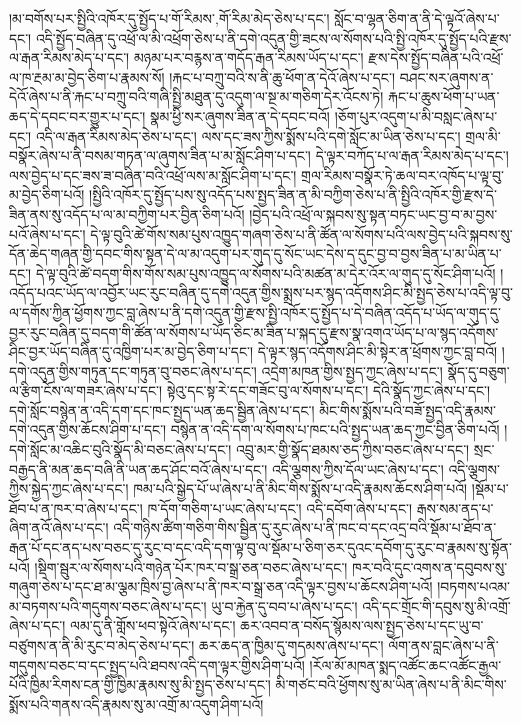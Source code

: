 །མ་བགོས་པར་སྤྱིའི་འཁོར་དུ་སྤྱོད་པ་{གོ་རིམས་,གོ་རིམ་}མེད་ཅེས་པ་དང་། སློང་བ་ལྷན་ཅིག་ན་ནི་དེ་ལྟའོ་ཞེས་པ་དང་། འདི་སྤྱོད་བཞིན་དུ་འཕྲོ་ལ་མི་འཕྲོག་ཅེས་པ་ནི་དགེ་འདུན་གྱི་ཟངས་ལ་སོགས་པའི་སྤྱི་འཁོར་དུ་སྤྱོད་པའི་རྫས་ལ་རྒན་རིམས་མེད་པ་དང་། མཉམ་པར་བརྙས་ན་གདོད་རྒན་རིམས་ཡོད་པ་དང་། རྫས་དེས་སྤྱོད་བཞིན་པའི་འཕྲོ་ལ་ཁ་རྔམ་མ་བྱེད་ཅིག་པ་རྣམས་སོ། །རྐང་པ་བཀྲུ་བའི་ས་ནི་ཆུ་ཕོག་ན་དེའོ་ཞེས་པ་དང་། བཤང་སར་ཞུགས་ན་དེའོ་ཞེས་པ་ནི་རྐང་པ་བཀྲུ་བའི་གཞི་སྤྱི་མཐུན་དུ་འདུག་ལ་སྔ་མ་གཅིག་དེར་འོངས་ཏེ། རྐང་པ་ཆུས་ཕོག་པ་ཡན་ཆད་དེ་དབང་བར་གྱུར་པ་དང་། སྣམ་ཕྱི་སར་ཞུགས་ཟིན་ན་དེ་དབང་བའོ། །ཅོག་པུར་འདུག་པ་མི་བསླང་ཞེས་པ་དང་། འདི་ལ་རྒན་རིམས་མེད་ཅེས་པ་དང་། ལས་དང་ཟས་ཀྱིས་སྨོས་པའི་དགེ་སློང་མ་ཡིན་ཅེས་པ་དང་། གྲལ་མི་བསྣོར་ཞེས་པ་ནི་བསམ་གཏན་ལ་ཞུགས་ཟིན་པ་མ་སློང་ཤིག་པ་དང་། དེ་ལྟར་བཀོད་པ་ལ་རྒན་རིམས་མེད་པ་དང་། ལས་བྱེད་པ་དང་ཟས་ཟ་བཞིན་བའི་འཕྲོ་ལས་མ་སློང་ཤིག་པ་དང་། གྲལ་རིམས་བསྣོར་ཏེ་ཆལ་བར་འཁོད་པ་ལྟ་བུ་མ་བྱེད་ཅིག་པའོ། །སྤྱིའི་འཁོར་དུ་སྤྱོད་པས་སུ་འདོད་པས་སྤྱད་ཟིན་ན་མི་བཀྱིག་ཅེས་པ་ནི་སྤྱིའི་འཁོར་གྱི་རྫས་དེ་ཟིན་ནས་སུ་འདོད་པ་ལ་མ་བཀྱིག་པར་བྱིན་ཅིག་པའོ། །བྱེད་པའི་འཕྲོ་ལ་སྐབས་སུ་སྟན་བཏང་ཡང་བྱ་བ་མ་བྱས་པའོ་ཞེས་པ་དང་། དེ་ལྟ་བུའི་ཚེ་གོས་སམ་པུས་འཁྱུད་གཞག་ཅེས་པ་ནི་ཚོན་ལ་སོགས་པའི་ལས་བྱེད་པའི་སྐབས་སུ་དོན་ཆེད་གཞན་གྱི་དབང་གིས་སྟན་དེ་ལ་མ་འདུག་པར་གུད་དུ་སོང་ཡང་དེས་ད་དུང་བྱ་བ་བྱས་ཟིན་པ་མ་ཡིན་པ་དང་། དེ་ལྟ་བུའི་ཚེ་བདག་གིས་གོས་སམ་པུས་འཁྱུད་ལ་སོགས་པའི་མཚན་མ་དེར་འོར་ལ་གུད་དུ་སོང་ཤིག་པའོ། །འདོད་པའང་ཡོད་ལ་འབྱོར་ཡང་རུང་བཞིན་དུ་དགེ་འདུན་གྱིས་སྨྲས་པར་སྙད་འདོགས་ཤིང་མི་སྤྱད་ཅེས་པ་འདི་ལྟ་བུ་ལ་དགོས་ཀྱིན་ཕྱོགས་ཀྱང་བླ་ཞེས་པ་ནི་དགེ་འདུན་གྱི་རྫས་སྤྱི་འཁོར་དུ་སྤྱོད་པ་དེ་བཞིན་འདོད་པ་ཡོད་ལ་གུད་དུ་བྱར་རུང་བཞིན་དུ་བདག་གི་ཚོན་ལ་སོགས་པ་ཡོད་ཅིང་མ་ཟིན་པ་སྐད་དུ་རྫས་སྣ་འགའ་ཡོད་པ་ལ་སྙད་འདོགས་ཤིང་བྱར་ཡོད་བཞིན་དུ་འཁྱིག་པར་མ་བྱེད་ཅིག་པ་དང་། དེ་ལྟར་སྙད་འདོགས་ཤིང་མི་སྟེར་ན་ཕྲོགས་ཀྱང་བླ་བའོ། །དགེ་འདུན་གྱིས་གཏུན་དང་གཏུན་བུ་བཅང་ཞེས་པ་དང་། འདྲེག་མཁན་གྱིས་སྤྱད་ཀྱང་ཞེས་པ་དང་། སྣོད་དུ་བཅུག་ལ་རྩིག་ངོས་ལ་གཟར་ཞེས་པ་དང་། སྟེའུ་དང་སྟ་རེ་དང་གཟོང་བུ་ལ་སོགས་པ་དང་། དེའི་སྣོད་ཀྱང་ཞེས་པ་དང་། དགེ་སློང་བསྙེན་ན་འདི་དག་དང་ཁང་སྤྱད་ཡན་ཆད་སྦྱིན་ཞེས་པ་དང་། མིང་གིས་སྨོས་པའི་བཟོ་སྤྱད་འདི་རྣམས་དགེ་འདུན་གྱིས་ཆོངས་ཤིག་པ་དང་། བསྙེན་ན་འདི་དག་ལ་སོགས་པ་ཁང་པའི་སྤྱད་ཡན་ཆད་ཀྱང་བྱིན་ཅིག་པའོ། །དགེ་སློང་མ་འཆིང་བུའི་སྣོད་མི་བཅང་ཞེས་པ་དང་། འབྲུ་མར་གྱི་སྣོད་ཐམས་ཅད་ཀྱིས་བཅང་ཞེས་པ་དང་། སྲང་བརྒྱད་ནི་མན་ཆད་བཞི་ནི་ཡན་ཆད་ཤོང་བའོ་ཞེས་པ་དང་། འདི་ལྕགས་ཀྱིས་དོལ་ཡང་ཞེས་པ་དང་། འདི་ལྕགས་ཀྱིས་སྐྱེད་ཀྱང་ཞེས་པ་དང་། ཁམ་པའི་སྒྱེད་པོ་ཡ་ཞེས་པ་ནི་མིང་གིས་སྨོས་པ་འདི་རྣམས་ཆོངས་ཤིག་པའོ། །སྡོམ་པ་ཐོབ་པ་ན་ཁར་བ་ཞེས་པ་དང་། ཁ་དོག་གཅིག་པ་ཡང་ཞེས་པ་དང་། འདི་དབོག་ཞེས་པ་དང་། རྒས་སམ་ནད་པ་ཞིག་ནའོ་ཞེས་པ་དང་། འདི་གཉིས་ཚིག་གཅིག་གིས་སྦྱིན་དུ་རུང་ཞེས་པ་ནི་ཁང་བ་དང་འདྲ་བའི་སྡོམ་པ་ཐོབ་ན་རྒན་པོ་དང་ནད་པས་བཅང་དུ་རུང་བ་དང་འདི་དག་ལྟ་བུ་ལ་སྡོམ་པ་ཅིག་ཅར་དུའང་དབོག་དུ་རུང་བ་རྣམས་སུ་སྟོན་པའོ། །སྡིག་སྦུར་ལ་སོགས་པའི་གཉེན་པོར་ཁར་བ་སྒྲ་ཅན་བཅང་ཞེས་པ་དང་། ཁར་བའི་དུང་འགས་ན་དབུབས་སུ་གཞུག་ཅེས་པ་དང་ཐ་མ་ལྕམ་ཁྲིས་བྱ་ཞེས་པ་ནི་ཁར་བ་སྒྲ་ཅན་འདི་ལྟར་བྱས་པ་ཆོངས་ཤིག་པའོ། །བཏགས་པའམ་མ་བཏགས་པའི་གདུགས་བཅང་ཞེས་པ་དང་། ཡུ་བ་རྐྱེན་དུ་བབ་པ་ཞེས་པ་དང་། འདི་དང་གྲོང་གི་དབུས་སུ་མི་འགྲོ་ཞེས་པ་དང་། ལམ་དུ་ནི་གློས་ཕབ་སྟེའོ་ཞེས་པ་དང་། ཆར་འབབ་ན་བསོད་སྙོམས་ལས་སྤྱད་ཅེས་པ་དང་ཡུ་བ་བཙུགས་ན་ནི་མི་རུང་བ་མེད་ཅེས་པ་དང་། ཆར་ཆད་ན་ཁྱིམ་དུ་གདམས་ཞེས་པ་དང་། ལོག་ནས་བླང་ཞེས་པ་ནི་གདུགས་བཅང་བ་དང་སྤྱད་པའི་ཐབས་འདི་དག་ལྟར་གྱིས་ཤིག་པའོ། །རོལ་མོ་མཁན་སྨད་འཚོང་ཆང་འཚོང་རྒྱལ་པོའི་ཁྱིམ་རིགས་ངན་གྱི་ཁྱིམ་རྣམས་སུ་མི་སྤྱད་ཅེས་པ་དང་། མི་གཙང་བའི་ཕྱོགས་སུ་མ་ཡིན་ཞེས་པ་ནི་མིང་གིས་སྨོས་པའི་གནས་འདི་རྣམས་སུ་མ་འགྲོ་མ་འདུག་ཤིག་པའོ། 